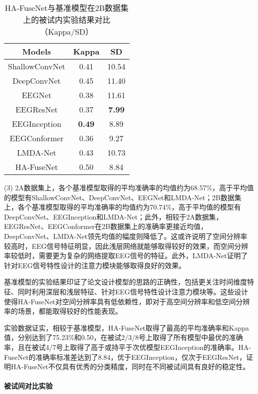 \begin{table}[H]
    \centering
    \caption{HA-FuseNet与基准模型在2B数据集上的被试内实验结果对比（Kappa/SD）}
    \label{tab:2bcompareinsd}
    \begin{tabularx}{\textwidth}{CCC}
      \toprule
      Models & Kappa & SD \\
      \midrule
      ShallowConvNet\cite{schirrmeister2017deep} &0.41&10.54\\
      DeepConvNet\cite{schirrmeister2017deep} &0.45&11.40\\
      EEGNet\cite{lawhern2018eegnet} &0.38& 11.61\\
      EEGResNet\cite{HBM:HBM23730} &0.37&\textbf{7.99}\\
      EEGInception\cite{zhang2021eeg} &\textbf{0.49}&8.89\\
      EEGConformer\cite{song2022eeg} &0.36&9.27\\
      LMDA-Net\cite{miao2023lmda} &0.43&10.73\\
      \midrule 
      HA-FuseNet &0.50&8.84\\
      \bottomrule
    \end{tabularx}
\end{table}

(3) 2A数据集上，各个基准模型取得的平均准确率的均值约为68.57\%，高于平均值的模型有ShallowConvNet、DeepConvNet、EEGNet和LMDA-Net；2B数据集上，各个基准模型取得的平均准确率的均值约为70.74\%，高于平均值的模型有DeepConvNet、EEGInception和LMDA-Net；此外，相较于2A数据集，EEGResNet、EEGConformer在2B数据集上的准确率更接近均值，DeepConvNet、LMDA-Net领先均值的幅度则降低了。这或许说明了空间分辨率较高时，EEG信号特征明显，因此浅层网络就能够取得较好的效果，而空间分辨率较低时，需要更为复杂的网络提取EEG信号的特征。此外，LMDA-Net证明了针对EEG信号特性设计的注意力模块能够取得良好的效果。

基准模型的实验结果印证了论文设计模型的思路的正确性，包括更关注时间维度特征、同时利用深层和浅层特征、针对EEG信号特性设计注意力模块等。这些设计使得HA-FuseNet对空间分辨率具有低依赖性，即对于高空间分辨率和低空间分辨率的场景，都能取得较好的性能表现。

实验数据证实，相较于基准模型，HA-FuseNet取得了最高的平均准确率和Kappa值，分别达到了75.23\%和0.50，在被试2/3/8号上取得了所有模型中最优的准确率，且在被试4/7号上取得了高于或持平于次优模型EEGInception的准确率。HA-FuseNet的准确率标准差达到了8.84，优于EEGInception，仅次于EEGResNet，证明HA-FuseNet不仅具有优秀的分类精度，同时在不同被试间具有良好的稳定性。

\paragraph{被试间对比实验}

